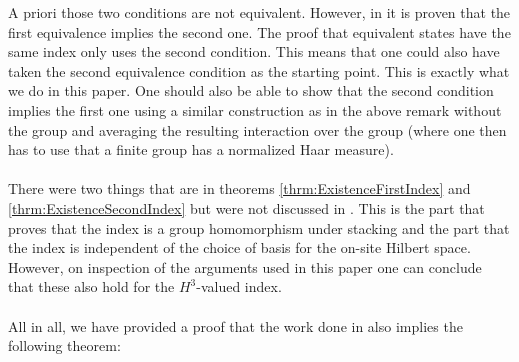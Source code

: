 \documentclass[11pt,a4paper,twoside]{article}
\numberwithin{equation}{section}
\begin{document}
	A priori those two conditions are not equivalent. However, in \cite{ogata2021h3gmathbb} it is proven that the first equivalence implies the second one. The proof that equivalent states have the same index only uses the second condition. This means that one could also have taken the second equivalence condition as the starting point. This is exactly what we do in this paper. One should also be able to show that the second condition implies the first one using a similar construction as in the above remark without the group and averaging the resulting interaction over the group (where one then has to use that a finite group has a normalized Haar measure).\\\\
	There were two things that are in theorems \ref{thrm:ExistenceFirstIndex} and \ref{thrm:ExistenceSecondIndex} but were not discussed in \cite{ogata2021h3gmathbb}. This is the part that proves that the index is a group homomorphism under stacking and the part that the index is independent of the choice of basis for the on-site Hilbert space. However, on inspection of the arguments used in this paper one can conclude that these also hold for the $H^3$-valued index.\\\\
	All in all, we have provided a proof that the work done in \cite{ogata2021h3gmathbb} also implies the following theorem:
\end{document}
